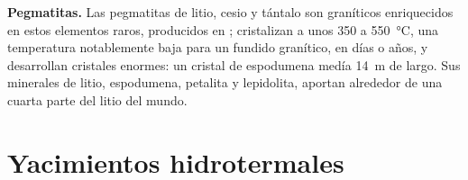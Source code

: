\textbf{Pegmatitas.} Las pegmatitas de litio, cesio y tántalo son  graníticos enriquecidos en estos
elementos raros, producidos en ; cristalizan a unos 350 a \qty{550}{\celsius},
una temperatura notablemente baja para un fundido granítico, en días o años, y desarrollan cristales enormes: un
cristal de espodumena medía \qty{14}{m} de largo. Sus minerales de litio, espodumena, petalita y
lepidolita, aportan alrededor de una cuarta parte del litio del mundo.

\section{Yacimientos hidrotermales}\label{sec:b2:ore-deposits:hydrothermal}

